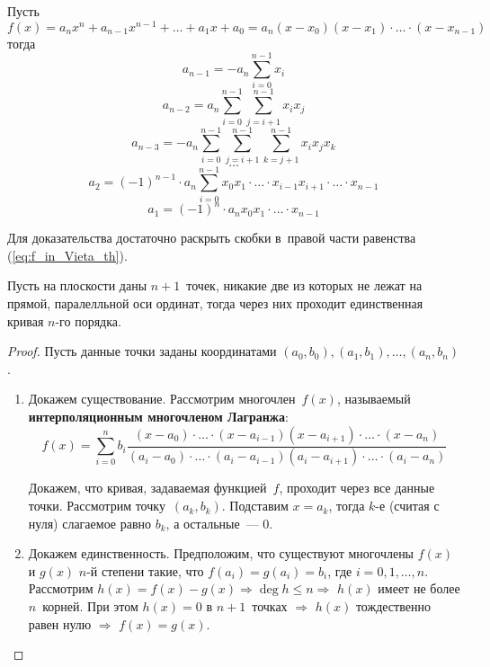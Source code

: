 \begin{theorem}
Пусть 
\begin{equation}
\label{eq:f_in_Vieta_th}
f(x) = a_n x^n + a_{n-1} x^{n-1} + \ldots + a_1 x + a_0 = a_n(x - x_0)(x - x_1) \cdot \ldots \cdot (x - x_{n-1})
\end{equation}
тогда
\begin{equation*}
a_{n-1} = -a_n \sum_{i=0}^{n-1} x_i
\end{equation*}
\begin{equation*}
a_{n-2} = a_n \sum_{i=0}^{n-1} \sum_{j=i+1}^{n-1} x_i x_j
\end{equation*}
\begin{equation*}
a_{n-3} = -a_n \sum_{i=0}^{n-1} \sum_{j=i+1}^{n-1} \sum_{k=j+1}^{n-1} x_i x_j x_k
\end{equation*}
\begin{equation*}
\ldots
\end{equation*}
\begin{equation*}
a_2 = (-1)^{n-1} \cdot a_n \sum_{i=0}^{n-1} x_0 x_1 \cdot \ldots \cdot x_{i-1} x_{i+1} \cdot \ldots \cdot x_{n-1}
\end{equation*}
\begin{equation*}
a_1 = (-1)^n \cdot a_n x_0 x_1 \cdot \ldots \cdot x_{n-1}
\end{equation*}
\end{theorem}%
Для доказательства достаточно раскрыть скобки в~правой части равенства (\ref*{eq:f_in_Vieta_th}).

\begin{theorem}
Пусть на плоскости даны $n + 1$~точек, никакие две из которых не лежат на прямой, паралелльной оси ординат, тогда через них проходит единственная кривая $n$\nobreakdash-го порядка.
\end{theorem}
\begin{proof}
Пусть данные точки заданы координатами $(a_0, b_0), (a_1, b_1), \ldots, (a_n, b_n)$.
\begin{enumerate}
	\item Докажем существование.
	Рассмотрим многочлен~$f(x)$, называемый \textbf{интерполяционным многочленом Лагранжа}:
	\begin{equation*}
	f(x) = \sum_{i=0}^n b_i \frac
	{(x - a_0) \cdot \ldots \cdot (x - a_{i-1})(x - a_{i+1}) \cdot \ldots \cdot (x - a_n)}
	{(a_i - a_0) \cdot \ldots \cdot (a_i - a_{i-1})(a_i - a_{i+1}) \cdot \ldots \cdot (a_i - a_n)}
	\end{equation*}
	
	Докажем, что кривая, задаваемая функцией~$f$, проходит через все данные точки.
	Рассмотрим точку~$(a_k, b_k)$.
	Подставим $x = a_k$, тогда $k$\nobreakdash-е (считая с нуля) слагаемое равно $b_k$, а остальные~--- 0.
	
	\item Докажем единственность.
	Предположим, что существуют многочлены $f(x)$ и $g(x)$ $n$-й степени такие, что $f(a_i) = g(a_i) = b_i$, где $i = 0, 1, \ldots, n$.
	Рассмотрим $h(x) = f(x) - g(x) \Rightarrow \deg h \leqslant n \Rightarrow$ $h(x)$ имеет не более $n$~корней.
	При этом $h(x) = 0$ в $n + 1$~точках $\Rightarrow$ $h(x)$ тождественно равен нулю $\Rightarrow$ $f(x) = g(x)$.
\end{enumerate}
\end{proof}